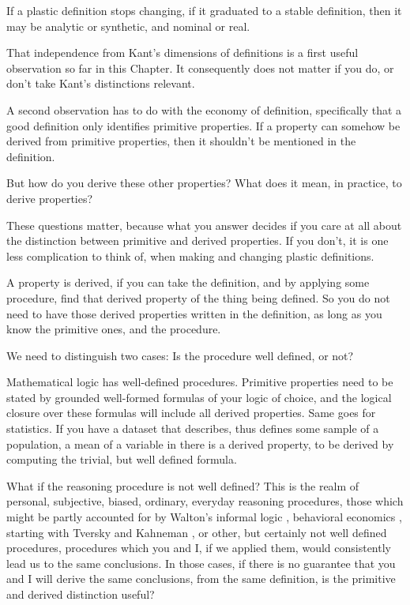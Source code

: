 If a plastic definition stops changing, if it graduated to a stable definition, then it may be analytic or synthetic, and nominal or real. 

That independence from Kant's dimensions of definitions is a first useful observation so far in this Chapter. It consequently does not matter if you do, or don't take Kant's distinctions relevant. 

A second observation has to do with the economy of definition, specifically that a good definition only identifies primitive properties. If a property can somehow be derived from primitive properties, then it shouldn't be mentioned in the definition. 

But how do you derive these other properties? What does it mean, in practice, to derive properties? 

These questions matter, because what you answer decides if you care at all about the distinction between primitive and derived properties. If you don't, it is one less complication to think of, when making and changing plastic definitions.

A property is derived, if you can take the definition, and by applying some procedure, find that derived property of the thing being defined. So you do not need to have those derived properties written in the definition, as long as you know the primitive ones, and the procedure.

We need to distinguish two cases: Is the procedure well defined, or not? 

Mathematical logic has well-defined procedures. Primitive properties need to be stated by grounded well-formed formulas of your logic of choice, and the logical closure over these formulas will include all derived properties. Same goes for statistics. If you have a dataset that describes, thus defines some sample of a population, a mean of a variable in there is a derived property, to be derived by computing the trivial, but well defined formula. 

What if the reasoning procedure is not well defined? This is the realm of personal, subjective, biased, ordinary, everyday reasoning procedures, those which might be partly accounted for by Walton's informal logic \cite{walton1989informal},  behavioral economics \cite{mullainathan2000behavioral}, starting with Tversky and Kahneman \cite{kahneman2013prospect}, or other, but certainly not well defined procedures, procedures which you and I, if we applied them, would consistently lead us to the same conclusions. In those cases, if there is no guarantee that you and I will derive the same conclusions, from the same definition, is the primitive and derived distinction useful?

